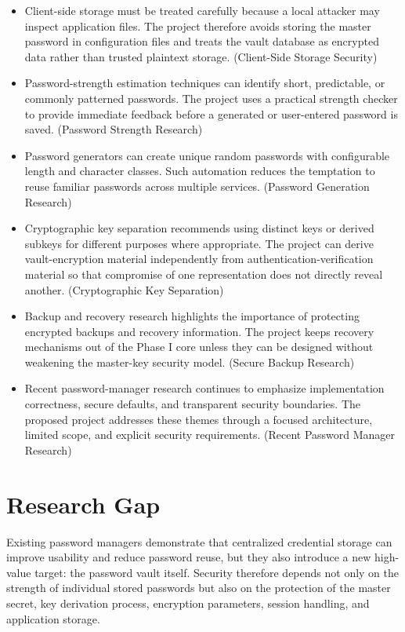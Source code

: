 \documentclass[12pt,a4paper,oneside]{report}
\begin{document}
\begin{itemize}
\item Client-side storage must be treated carefully because a local attacker may inspect application files. The project therefore avoids storing the master password in configuration files and treats the vault database as encrypted data rather than trusted plaintext storage. (Client-Side Storage Security)
\item Password-strength estimation techniques can identify short, predictable, or commonly patterned passwords. The project uses a practical strength checker to provide immediate feedback before a generated or user-entered password is saved. (Password Strength Research)
\item Password generators can create unique random passwords with configurable length and character classes. Such automation reduces the temptation to reuse familiar passwords across multiple services. (Password Generation Research)
\item Cryptographic key separation recommends using distinct keys or derived subkeys for different purposes where appropriate. The project can derive vault-encryption material independently from authentication-verification material so that compromise of one representation does not directly reveal another. (Cryptographic Key Separation)
\item Backup and recovery research highlights the importance of protecting encrypted backups and recovery information. The project keeps recovery mechanisms out of the Phase I core unless they can be designed without weakening the master-key security model. (Secure Backup Research)
\item Recent password-manager research continues to emphasize implementation correctness, secure defaults, and transparent security boundaries. The proposed project addresses these themes through a focused architecture, limited scope, and explicit security requirements. (Recent Password Manager Research)
\end{itemize}

\section{Research Gap}

Existing password managers demonstrate that centralized credential storage can improve usability and reduce password reuse, but they also introduce a new high-value target: the password vault itself. Security therefore depends not only on the strength of individual stored passwords but also on the protection of the master secret, key derivation process, encryption parameters, session handling, and application storage.
\end{document}
